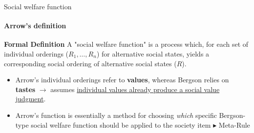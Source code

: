 \documentclass{beamer}
\begin{document}
\begin{frame}{Social welfare function}
    \framesubtitle{Arrow's definition}
    \textbf{Formal Definition} A "social welfare function" is a process which, for each set of individual orderings ($R_1, \dots, R_n$) for alternative social states, yields a corresponding social ordering of alternative social states ($R$).
    \vspace{0.25 cm}
    \begin{itemize}
        \item Arrow's individual orderings refer to \textbf{values}, whereas Bergson relies on \textbf{tastes} $\rightarrow$ assumes \uline{individual values already produce a social value judgment}.
        \vspace{0.25 cm}
        \item Arrow's function is essentially a method for choosing \textit{which} specific Bergson-type social welfare function should be applied to the society item $\blacktriangleright$ Meta-Rule
    \end{itemize}

\end{frame}
\end{document}
